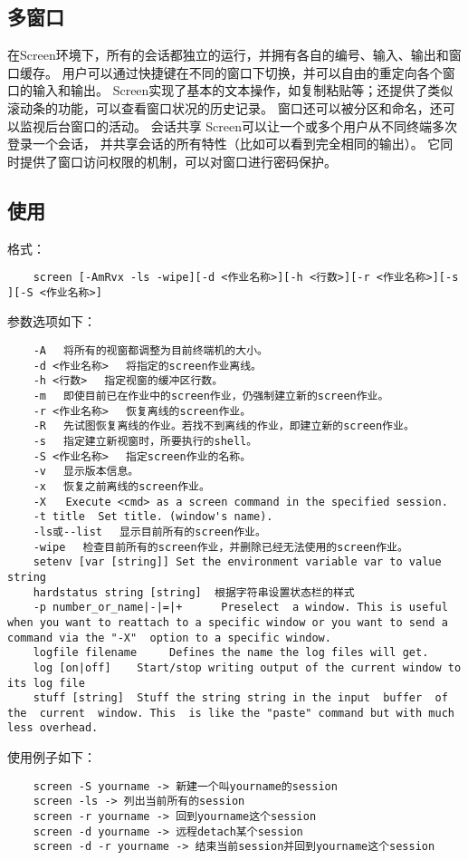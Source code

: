 \documentclass[a4paper,left=2.5cm,right=2.5cm,11pt]{article}
\begin{document}
\subsection{多窗口}
	在Screen环境下，所有的会话都独立的运行，并拥有各自的编号、输入、输出和窗口缓存。
	用户可以通过快捷键在不同的窗口下切换，并可以自由的重定向各个窗口的输入和输出。
	Screen实现了基本的文本操作，如复制粘贴等；还提供了类似滚动条的功能，可以查看窗口状况的历史记录。
	窗口还可以被分区和命名，还可以监视后台窗口的活动。 
	会话共享 Screen可以让一个或多个用户从不同终端多次登录一个会话，
	并共享会话的所有特性（比如可以看到完全相同的输出）。
	它同时提供了窗口访问权限的机制，可以对窗口进行密码保护。

\subsection{使用}
	格式：
	\begin{lstlisting}
	screen [-AmRvx -ls -wipe][-d <作业名称>][-h <行数>][-r <作业名称>][-s ][-S <作业名称>]
	\end{lstlisting}

	参数选项如下：
	\begin{lstlisting}
	-A 　将所有的视窗都调整为目前终端机的大小。 
	-d <作业名称> 　将指定的screen作业离线。 
	-h <行数> 　指定视窗的缓冲区行数。 
	-m 　即使目前已在作业中的screen作业，仍强制建立新的screen作业。 
	-r <作业名称> 　恢复离线的screen作业。 
	-R 　先试图恢复离线的作业。若找不到离线的作业，即建立新的screen作业。 
	-s 　指定建立新视窗时，所要执行的shell。 
	-S <作业名称> 　指定screen作业的名称。 
	-v 　显示版本信息。 
	-x 　恢复之前离线的screen作业。 
	-X   Execute <cmd> as a screen command in the specified session.
	-t title  Set title. (window's name).
	-ls或--list 　显示目前所有的screen作业。 
	-wipe 　检查目前所有的screen作业，并删除已经无法使用的screen作业。
	setenv [var [string]] Set the environment variable var to value string
	hardstatus string [string] 	根据字符串设置状态栏的样式
	-p number_or_name|-|=|+		 Preselect  a window. This is useful when you want to reattach to a specific window or you want to send a command via the "-X"  option to a specific window.
	logfile filename	 Defines the name the log files will get.
	log [on|off]	Start/stop writing output of the current window to its log file
	stuff [string]	Stuff the string string in the input  buffer  of  the  current  window. This  is like the "paste" command but with much less overhead.
	\end{lstlisting}

	使用例子如下：
	\begin{lstlisting}
	screen -S yourname -> 新建一个叫yourname的session 
	screen -ls -> 列出当前所有的session 
	screen -r yourname -> 回到yourname这个session 
	screen -d yourname -> 远程detach某个session 
	screen -d -r yourname -> 结束当前session并回到yourname这个session
	\end{lstlisting}
\end{document}
